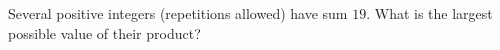 Several positive integers (repetitions allowed) have sum $19$. What is the largest possible value of their product?
